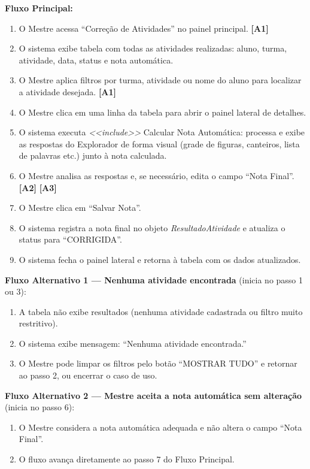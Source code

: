 \documentclass[12pt, a4paper]{article}
\begin{document}
\medskip
\textbf{Fluxo Principal:}
\begin{enumerate}
    \item O Mestre acessa ``Correção de Atividades'' no painel principal. \textbf{[A1]}
    \item O sistema exibe tabela com todas as atividades realizadas: aluno, turma, atividade, data, status e nota automática.
    \item O Mestre aplica filtros por turma, atividade ou nome do aluno para localizar a atividade desejada. \textbf{[A1]}
    \item O Mestre clica em uma linha da tabela para abrir o painel lateral de detalhes.
    \item O sistema executa \textit{<<include>>} Calcular Nota Automática: processa e exibe as respostas do Explorador de forma visual (grade de figuras, canteiros, lista de palavras etc.) junto à nota calculada.
    \item O Mestre analisa as respostas e, se necessário, edita o campo ``Nota Final''. \textbf{[A2]} \textbf{[A3]}
    \item O Mestre clica em ``Salvar Nota''.
    \item O sistema registra a nota final no objeto \textit{ResultadoAtividade} e atualiza o status para ``CORRIGIDA''.
    \item O sistema fecha o painel lateral e retorna à tabela com os dados atualizados.
\end{enumerate}

\textbf{Fluxo Alternativo 1 --- Nenhuma atividade encontrada} (inicia no passo 1 ou 3):
\begin{enumerate}
    \item A tabela não exibe resultados (nenhuma atividade cadastrada ou filtro muito restritivo).
    \item O sistema exibe mensagem: ``Nenhuma atividade encontrada.''
    \item O Mestre pode limpar os filtros pelo botão ``MOSTRAR TUDO'' e retornar ao passo 2, ou encerrar o caso de uso.
\end{enumerate}

\textbf{Fluxo Alternativo 2 --- Mestre aceita a nota automática sem alteração} (inicia no passo 6):
\begin{enumerate}
    \item O Mestre considera a nota automática adequada e não altera o campo ``Nota Final''.
    \item O fluxo avança diretamente ao passo 7 do Fluxo Principal.
\end{enumerate}
\end{document}
